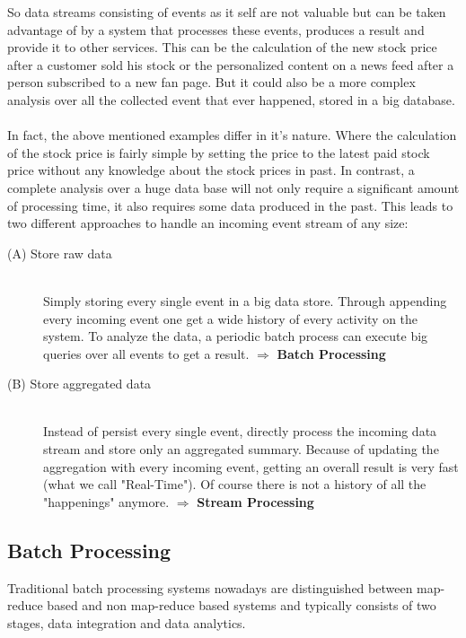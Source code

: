 So data streams consisting of events as it self are not valuable but
can be taken advantage of by a system that processes these events, produces a
result and provide it to other services. This can be the calculation of the new
stock price after a customer sold his stock or the personalized content on a
news feed after a person subscribed to a new fan page. But it could also be a
more complex analysis over all the collected event that ever happened, stored in
a big database. 
\\ \\
In fact, the above mentioned examples differ in it's nature. Where the
calculation of the stock price is fairly simple by setting the price to the
latest paid stock price without any knowledge about the stock prices in past. 
In contrast, a complete analysis over a huge data base will not only require a
significant amount of processing time, it also requires some data produced in the
past. This leads to two different approaches to handle an incoming event stream
of any size: 

\begin{description}
    \item[(A) Store raw data]  \hfill \\
    {Simply storing every single event in a big data store. Through appending
    every incoming event one get a wide history of every activity on the system.
    To analyze the data, a periodic batch process can execute big queries over
    all events to get a result.  $ \Rightarrow $  \textbf{Batch Processing}}
    \item[(B) Store aggregated data  ] \hfill \\
    {Instead of persist every single event, directly process the incoming data stream and store
    only an aggregated summary. Because of updating the aggregation with every
    incoming event, getting an overall result is very fast (what we call
    "Real-Time"). Of course there is not a history of all the "happenings"
    anymore. $ \Rightarrow $ \textbf{Stream Processing}} 
\end{description}
\cite{TalkKleppmann}


\subsection{Batch Processing}
\label{intro-datastream-batchprocessing}
Traditional batch processing systems nowadays are distinguished between
map-reduce based and non map-reduce based systems and typically consists of two
stages, data integration and data analytics.  

